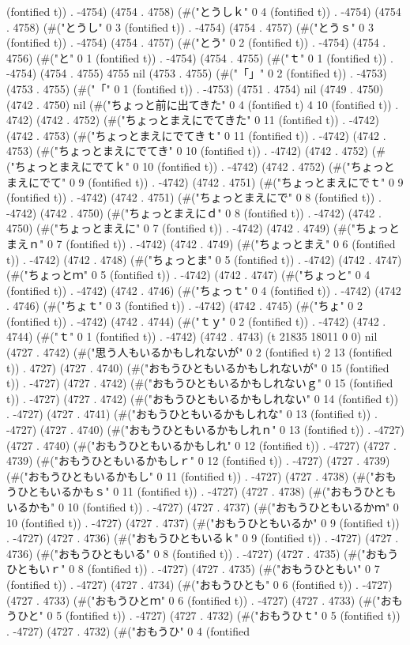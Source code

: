 (fontified t)) . -4754) (4754 . 4758) (#("とうしｋ" 0 4 (fontified t)) . -4754) (4754 . 4758) (#("とうし" 0 3 (fontified t)) . -4754) (4754 . 4757) (#("とうｓ" 0 3 (fontified t)) . -4754) (4754 . 4757) (#("とう" 0 2 (fontified t)) . -4754) (4754 . 4756) (#("と" 0 1 (fontified t)) . -4754) (4754 . 4755) (#("ｔ" 0 1 (fontified t)) . -4754) (4754 . 4755) 4755 nil (4753 . 4755) (#("「」" 0 2 (fontified t)) . -4753) (4753 . 4755) (#("「" 0 1 (fontified t)) . -4753) (4751 . 4754) nil (4749 . 4750) (4742 . 4750) nil (#("ちょっと前に出てきた" 0 4 (fontified t) 4 10 (fontified t)) . 4742) (4742 . 4752) (#("ちょっとまえにでてきた" 0 11 (fontified t)) . -4742) (4742 . 4753) (#("ちょっとまえにでてきｔ" 0 11 (fontified t)) . -4742) (4742 . 4753) (#("ちょっとまえにでてき" 0 10 (fontified t)) . -4742) (4742 . 4752) (#("ちょっとまえにでてｋ" 0 10 (fontified t)) . -4742) (4742 . 4752) (#("ちょっとまえにでて" 0 9 (fontified t)) . -4742) (4742 . 4751) (#("ちょっとまえにでｔ" 0 9 (fontified t)) . -4742) (4742 . 4751) (#("ちょっとまえにで" 0 8 (fontified t)) . -4742) (4742 . 4750) (#("ちょっとまえにｄ" 0 8 (fontified t)) . -4742) (4742 . 4750) (#("ちょっとまえに" 0 7 (fontified t)) . -4742) (4742 . 4749) (#("ちょっとまえｎ" 0 7 (fontified t)) . -4742) (4742 . 4749) (#("ちょっとまえ" 0 6 (fontified t)) . -4742) (4742 . 4748) (#("ちょっとま" 0 5 (fontified t)) . -4742) (4742 . 4747) (#("ちょっとｍ" 0 5 (fontified t)) . -4742) (4742 . 4747) (#("ちょっと" 0 4 (fontified t)) . -4742) (4742 . 4746) (#("ちょっｔ" 0 4 (fontified t)) . -4742) (4742 . 4746) (#("ちょｔ" 0 3 (fontified t)) . -4742) (4742 . 4745) (#("ちょ" 0 2 (fontified t)) . -4742) (4742 . 4744) (#("ｔｙ" 0 2 (fontified t)) . -4742) (4742 . 4744) (#("ｔ" 0 1 (fontified t)) . -4742) (4742 . 4743) (t 21835 18011 0 0) nil (4727 . 4742) (#("思う人もいるかもしれないが" 0 2 (fontified t) 2 13 (fontified t)) . 4727) (4727 . 4740) (#("おもうひともいるかもしれないが" 0 15 (fontified t)) . -4727) (4727 . 4742) (#("おもうひともいるかもしれないｇ" 0 15 (fontified t)) . -4727) (4727 . 4742) (#("おもうひともいるかもしれない" 0 14 (fontified t)) . -4727) (4727 . 4741) (#("おもうひともいるかもしれな" 0 13 (fontified t)) . -4727) (4727 . 4740) (#("おもうひともいるかもしれｎ" 0 13 (fontified t)) . -4727) (4727 . 4740) (#("おもうひともいるかもしれ" 0 12 (fontified t)) . -4727) (4727 . 4739) (#("おもうひともいるかもしｒ" 0 12 (fontified t)) . -4727) (4727 . 4739) (#("おもうひともいるかもし" 0 11 (fontified t)) . -4727) (4727 . 4738) (#("おもうひともいるかもｓ" 0 11 (fontified t)) . -4727) (4727 . 4738) (#("おもうひともいるかも" 0 10 (fontified t)) . -4727) (4727 . 4737) (#("おもうひともいるかｍ" 0 10 (fontified t)) . -4727) (4727 . 4737) (#("おもうひともいるか" 0 9 (fontified t)) . -4727) (4727 . 4736) (#("おもうひともいるｋ" 0 9 (fontified t)) . -4727) (4727 . 4736) (#("おもうひともいる" 0 8 (fontified t)) . -4727) (4727 . 4735) (#("おもうひともいｒ" 0 8 (fontified t)) . -4727) (4727 . 4735) (#("おもうひともい" 0 7 (fontified t)) . -4727) (4727 . 4734) (#("おもうひとも" 0 6 (fontified t)) . -4727) (4727 . 4733) (#("おもうひとｍ" 0 6 (fontified t)) . -4727) (4727 . 4733) (#("おもうひと" 0 5 (fontified t)) . -4727) (4727 . 4732) (#("おもうひｔ" 0 5 (fontified t)) . -4727) (4727 . 4732) (#("おもうひ" 0 4 (fontified 